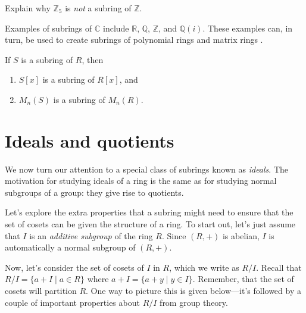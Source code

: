 \begin{problem}
Explain why $\mathbb{Z}_5$ is \emph{not} a subring of $\mathbb{Z}$.
\end{problem}

Examples of subrings of $\mathbb{C}$ include $\mathbb{R}$, $\mathbb{Q}$, $\mathbb{Z}$, and $\mathbb{Q}(i)$. These examples can, in turn, be used to create subrings of polynomial rings and matrix rings .

\begin{theorem}
If $S$ is a subring of $R$, then
\begin{enumerate}
\item $S[x]$ is a subring of $R[x]$, and 
\item $M_n(S)$ is a subring of $M_n(R)$.
\end{enumerate}
\end{theorem}

\section{Ideals and quotients}
We now turn our attention to a special class of subrings known as \emph{ideals}. The motivation for studying ideals of a ring is the same as for studying normal subgroups of a group: they give rise to quotients.

Let's explore the extra properties that a subring might need to ensure that the set of cosets can be given the structure of a ring. To start out, let's just assume that  $I$ is an \emph{additive subgroup} of the ring $R$. Since $(R,+)$ is abelian, $I$ is automatically a normal subgroup of $(R,+)$.  

Now, let's consider the set of cosets of $I$ in $R$, which we write as $R/I$. Recall that $R/I = \{a + I\mid a\in R\}$ where $a+I = \{a+y\mid y\in I\}$. Remember, that the set of cosets will partition $R$. One way to picture this is given below---it's followed by a couple of important properties about $R/I$ from group theory.

\begin{center}
\end{center}

